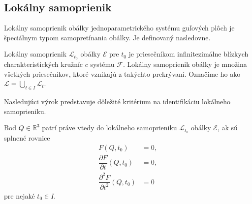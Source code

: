 \subsection{Lokálny samoprienik}
Lokálny samoprienik obálky jednoparametrického systému guľových plôch je špeciálnym typom samopretínania obálky. Je definovaný nasledovne.
\begin{definition} \label{definicia lokalny samoprienik}
Lokálny samoprienik $\mathcal{L}_{t_0}$ obálky $\mathcal{E}$ pre $t_0$ je priesečníkom infinitezimálne blízkych charakteristických kružníc $c$ systému $\mathcal{F}$. Lokálny samoprienik obálky je množina všetkých priesečníkov, ktoré vznikajú z takýchto prekrývaní. Označíme ho ako $\mathcal{L} = \bigcup_{t \in I} \mathcal{L}_t$.
\end{definition}

Nasledujúci výrok predstavuje dôležité kritérium na identifikáciu lokálneho samoprieniku.
\begin{lemma} \label{kriterium o lokalnom samoprieniku}
Bod $Q \in \mathbb{R}^3$ patrí práve vtedy do lokálneho samoprieniku $\mathcal{L}_{t_0}$ obálky $\mathcal{E}$, ak sú splnené rovnice
\begin{align*}
F(Q,t_0) &= 0, \\
\dfrac{\partial F}{\partial t}(Q,t_0) &= 0, \\
\dfrac{\partial^2 F}{\partial t^2}(Q,t_0) &= 0
\end{align*}
pre nejaké $t_0 \in I.$
\end{lemma}

